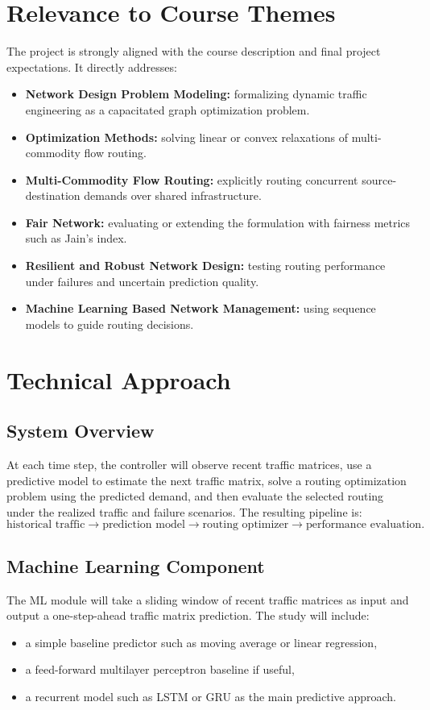 \documentclass[11pt]{article}
\begin{document}
\section{Relevance to Course Themes}
The project is strongly aligned with the course description and final project expectations. It directly addresses:
\begin{itemize}
    \item \textbf{Network Design Problem Modeling:} formalizing dynamic traffic engineering as a capacitated graph optimization problem.
    \item \textbf{Optimization Methods:} solving linear or convex relaxations of multi-commodity flow routing.
    \item \textbf{Multi-Commodity Flow Routing:} explicitly routing concurrent source-destination demands over shared infrastructure.
    \item \textbf{Fair Network:} evaluating or extending the formulation with fairness metrics such as Jain's index.
    \item \textbf{Resilient and Robust Network Design:} testing routing performance under failures and uncertain prediction quality.
    \item \textbf{Machine Learning Based Network Management:} using sequence models to guide routing decisions.
\end{itemize}

\section{Technical Approach}
\subsection{System Overview}
At each time step, the controller will observe recent traffic matrices, use a predictive model to estimate the next traffic matrix, solve a routing optimization problem using the predicted demand, and then evaluate the selected routing under the realized traffic and failure scenarios. The resulting pipeline is:
\[
\text{historical traffic} \rightarrow \text{prediction model} \rightarrow \text{routing optimizer} \rightarrow \text{performance evaluation}.
\]

\subsection{Machine Learning Component}
The ML module will take a sliding window of recent traffic matrices as input and output a one-step-ahead traffic matrix prediction. The study will include:
\begin{itemize}
    \item a simple baseline predictor such as moving average or linear regression,
    \item a feed-forward multilayer perceptron baseline if useful,
    \item a recurrent model such as LSTM or GRU as the main predictive approach.
\end{itemize}
\end{document}
